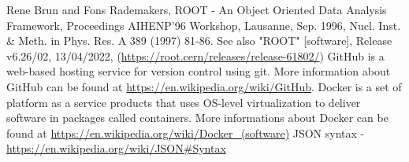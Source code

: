 \documentclass{article}
\begin{document}
\begin{thebibliography}{99}
        Rene Brun and Fons Rademakers, ROOT - An Object Oriented Data Analysis Framework,
        Proceedings AIHENP'96 Workshop, Lausanne, Sep. 1996,
        Nucl. Inst. \& Meth. in Phys. Res. A 389 (1997) 81-86.
        See also "ROOT" [software], Release v6.26/02, 13/04/2022,
        (\url{https://root.cern/releases/release-61802/})
        GitHub is a web-based hosting service for version control using git.
        More information about GitHub can be found at \url{https://en.wikipedia.org/wiki/GitHub}.
        Docker is a set of platform as a service products that uses OS-level virtualization to deliver software in packages called containers.
        More informations about Docker can be found at \url{https://en.wikipedia.org/wiki/Docker_(software)}
        JSON syntax - \url{https://en.wikipedia.org/wiki/JSON\#Syntax}
\end{thebibliography}
\end{document}
